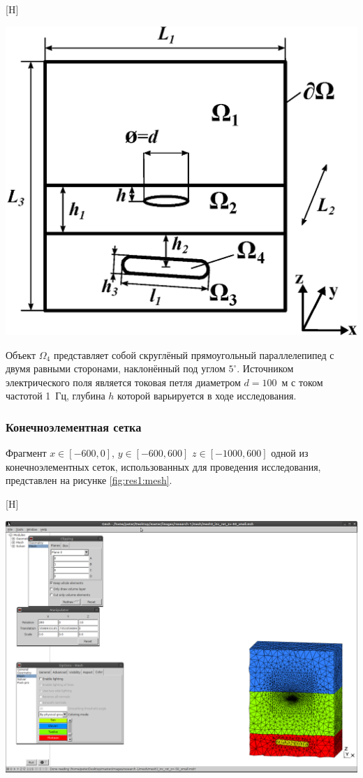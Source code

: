 \documentclass[a4paper,14pt]{article}
\makeatletter
\renewenvironment{figure}[1][\fps@figure]{
  \edef\@tempa{\noexpand\@float{figure}[#1]}
  \@tempa
  \addtocounter{foofigure}{1}
}{
  \end@float
}
\makeatother
\begin{document}
\begin{figure}[H]
	\centering
	\includegraphics[scale=0.7]{research-1/area_3layers_shift_3.eps}
	\caption{расчётная область}
	\label{fig:res1:area}
\end{figure}

\noindent Объект $\Omega_4$ представляет собой скруглёный прямоугольный параллелепипед с двумя равными сторонами, наклонённый под углом $5^{\circ}$. Источником электрического поля является токовая петля диаметром $d=100$~м с током частотой 1~Гц, глубина $h$ которой варьируется в ходе исследования.

\subsubsection{Конечноэлементная сетка}
Фрагмент $x \in [-600,0]$, $y \in [-600,600]$ $z \in [-1000,600]$ одной из конечноэлементных сеток, использованных для проведения исследования, представлен на рисунке \ref{fig:res1:mesh}.

\begin{figure}[H]
	\centering
	\includegraphics[trim=390mm 20mm 5mm 195mm,clip,scale=0.5]{research-1/mesh/mesh.png}
	\caption{фрагмент конечноэлементной сетки}
	\label{fig:res1:mesh}
\end{figure}
\end{document}
